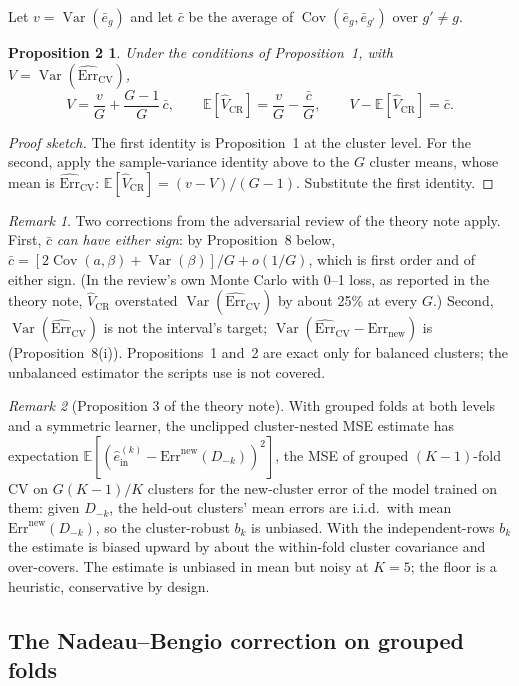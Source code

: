 \documentclass[11pt]{amsart}
\theoremstyle{plain}
\newtheorem*{prop2}{Proposition 2}
\theoremstyle{definition}
\theoremstyle{remark}
\newtheorem*{rem}{Remark}
\newcommand{\Var}{\operatorname{Var}}
\newcommand{\Cov}{\operatorname{Cov}}
\newcommand{\E}{\mathbb{E}}
\newcommand{\CV}{\widehat{\mathrm{Err}}_{\mathrm{CV}}}
\newcommand{\Errnew}{\mathrm{Err}_{\mathrm{new}}}
\newcommand{\VCR}{\hat V_{\mathrm{CR}}}
\begin{document}
Let $v=\Var(\bar e_g)$ and let $\bar c$ be the average of $\Cov(\bar e_g,\bar e_{g'})$ over $g'\neq g$.

\begin{prop2}
Under the conditions of Proposition~1, with $V=\Var(\CV)$,
\[
V=\frac vG+\frac{G-1}{G}\,\bar c,\qquad \E[\VCR]=\frac vG-\frac{\bar c}{G},\qquad V-\E[\VCR]=\bar c .
\]
\end{prop2}

\begin{proof}[Proof sketch]
The first identity is Proposition~1 at the cluster level. For the second, apply the sample-variance identity above to the $G$ cluster means, whose mean is $\CV$: $\E[\VCR]=(v-V)/(G-1)$. Substitute the first identity.
\end{proof}

\begin{rem}
Two corrections from the adversarial review of the theory note apply. First, $\bar c$ \emph{can have either sign}: by Proposition~8 below, $\bar c=[2\Cov(a,\beta)+\Var(\beta)]/G+o(1/G)$, which is first order and of either sign. (In the review's own Monte Carlo with 0--1 loss, as reported in the theory note, $\VCR$ overstated $\Var(\CV)$ by about 25\% at every $G$.) Second, $\Var(\CV)$ is not the interval's target; $\Var(\CV-\Errnew)$ is (Proposition~8(i)). Propositions~1 and~2 are exact only for balanced clusters; the unbalanced estimator the scripts use is not covered.
\end{rem}

\begin{rem}[Proposition 3 of the theory note]
With grouped folds at both levels and a symmetric learner, the unclipped cluster-nested MSE estimate has expectation $\E[(\hat e^{(k)}_{\mathrm{in}}-\mathrm{Err}^{\mathrm{new}}(D_{-k}))^2]$, the MSE of grouped $(K-1)$-fold CV on $G(K-1)/K$ clusters for the new-cluster error of the model trained on them: given $D_{-k}$, the held-out clusters' mean errors are i.i.d.\ with mean $\mathrm{Err}^{\mathrm{new}}(D_{-k})$, so the cluster-robust $b_k$ is unbiased. With the independent-rows $b_k$ the estimate is biased upward by about the within-fold cluster covariance and over-covers. The estimate is unbiased in mean but noisy at $K=5$; the floor is a heuristic, conservative by design.
\end{rem}

\subsection{The Nadeau--Bengio correction on grouped folds}
\end{document}
